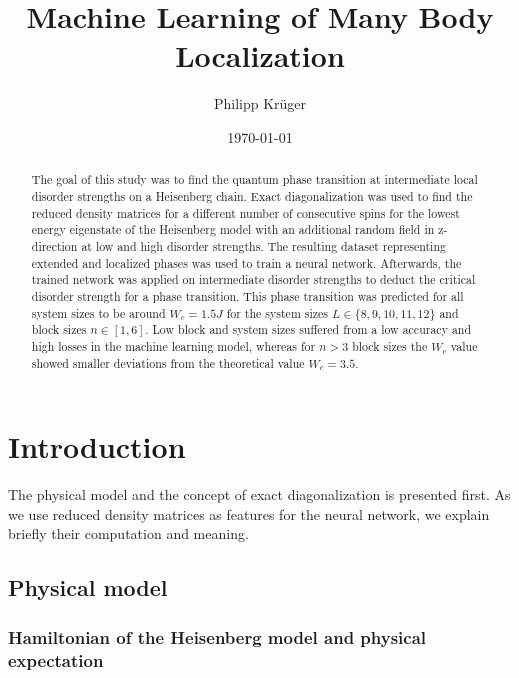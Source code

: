 \documentclass[reprint,amsmath,amssymb,aps,prb]{revtex4-2}
\begin{document}
%

\title{Machine Learning of Many Body Localization}

\author{Philipp Krüger}

\date{\today}%

\begin{abstract}
The goal of this study was to find the quantum phase transition at intermediate local disorder strengths on a Heisenberg chain. Exact diagonalization was used to find the reduced density matrices for a different number of consecutive spins for the lowest energy eigenstate of the Heisenberg model with an additional random field in z-direction at low and high disorder strengths. The resulting dataset representing extended and localized phases was used to train a neural network. Afterwards, the trained network was applied on intermediate disorder strengths to deduct the critical disorder strength for a phase transition. This phase transition was predicted for all system sizes to be around $W_c = 1.5 J$ for the system sizes $L\in\{8, 9, 10, 11, 12\}$ and block sizes $n\in\left[1,6\right]$. Low block and system sizes suffered from a low accuracy and high losses in the machine learning model, whereas for $n>3$ block sizes the $W_c$ value showed smaller deviations from the theoretical value $W_c=3.5$. %
\end{abstract}

\maketitle

\section{Introduction}

The physical model and the concept of exact diagonalization is presented first. As we use reduced density matrices as features for the neural network, we explain briefly their computation and meaning.
\subsection{Physical model}

\subsubsection{Hamiltonian of the Heisenberg model and physical expectation}
\end{document}
